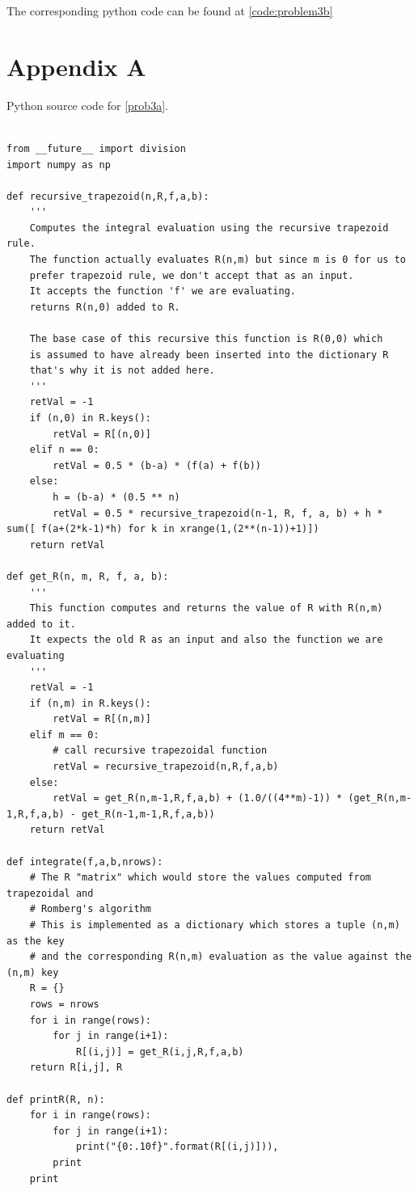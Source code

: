 \documentclass[a4paper,11pt]{article}
\begin{document}
The corresponding python code can be found at \ref{code:problem3b}
\clearpage


\section{Appendix A}\label{code:problem3a}
Python source code for \ref{prob3a}.
{\footnotesize
\begin{lstlisting}

from __future__ import division
import numpy as np

def recursive_trapezoid(n,R,f,a,b):
    '''
    Computes the integral evaluation using the recursive trapezoid rule.
    The function actually evaluates R(n,m) but since m is 0 for us to 
    prefer trapezoid rule, we don't accept that as an input.
    It accepts the function 'f' we are evaluating.
    returns R(n,0) added to R.

    The base case of this recursive this function is R(0,0) which
    is assumed to have already been inserted into the dictionary R
    that's why it is not added here.
    '''
    retVal = -1
    if (n,0) in R.keys():
        retVal = R[(n,0)]
    elif n == 0:
        retVal = 0.5 * (b-a) * (f(a) + f(b))
    else:
        h = (b-a) * (0.5 ** n)
        retVal = 0.5 * recursive_trapezoid(n-1, R, f, a, b) + h * sum([ f(a+(2*k-1)*h) for k in xrange(1,(2**(n-1))+1)])
    return retVal

def get_R(n, m, R, f, a, b):
    '''
    This function computes and returns the value of R with R(n,m) added to it.
    It expects the old R as an input and also the function we are evaluating
    '''
    retVal = -1
    if (n,m) in R.keys():
        retVal = R[(n,m)]
    elif m == 0:
        # call recursive trapezoidal function
        retVal = recursive_trapezoid(n,R,f,a,b)
    else:
        retVal = get_R(n,m-1,R,f,a,b) + (1.0/((4**m)-1)) * (get_R(n,m-1,R,f,a,b) - get_R(n-1,m-1,R,f,a,b))
    return retVal
        
def integrate(f,a,b,nrows):
    # The R "matrix" which would store the values computed from trapezoidal and
    # Romberg's algorithm
    # This is implemented as a dictionary which stores a tuple (n,m) as the key
    # and the corresponding R(n,m) evaluation as the value against the (n,m) key
    R = {}
    rows = nrows
    for i in range(rows):
        for j in range(i+1):
            R[(i,j)] = get_R(i,j,R,f,a,b)
    return R[i,j], R

def printR(R, n):
    for i in range(rows):
        for j in range(i+1):
            print("{0:.10f}".format(R[(i,j)])),
        print
    print


\end{lstlisting}}
\end{document}
